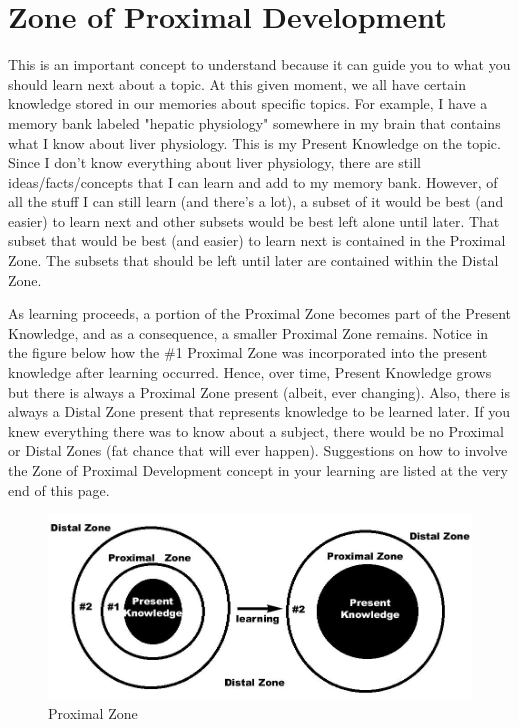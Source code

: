 \chapter{Zone of Proximal Development}

This is an important concept to understand because it can guide you to what you should learn next about a topic. At this given moment, we all have certain knowledge stored in our memories about specific topics. For example, I have a memory bank labeled "hepatic physiology" somewhere in my brain that contains what I know about liver physiology. This is my Present Knowledge on the topic. Since I don't know everything about liver physiology, there are still ideas/facts/concepts that I can learn and add to my memory bank. However, of all the stuff I can still learn (and there's a lot), a subset of it would be best (and easier) to learn next and other subsets would be best left alone until later. That subset that would be best (and easier) to learn next is contained in the Proximal Zone. The subsets that should be left until later are contained within the Distal Zone.

As learning proceeds, a portion of the Proximal Zone becomes part of the Present Knowledge, and as a consequence, a smaller Proximal Zone remains. Notice in the figure below how the \#1 Proximal Zone was incorporated into the present knowledge after learning occurred. Hence, over time, Present Knowledge grows but there is always a Proximal Zone present (albeit, ever changing). Also, there is always a Distal Zone present that represents knowledge to be learned later. If you knew everything there was to know about a subject, there would be no Proximal or Distal Zones (fat chance that will ever happen). Suggestions on how to involve the Zone of Proximal Development concept in your learning are listed at the very end of this page. 

\begin{figure}
	\centering
	\includegraphics[width=0.80\linewidth]{./images/pz}
	\caption{Proximal Zone}
	\label{fig:pz}
\end{figure}

